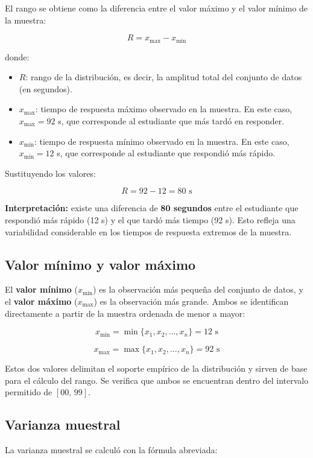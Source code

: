 \documentclass[12pt,letterpaper]{article}
\begin{document}
El rango se obtiene como la diferencia entre el valor máximo y el valor mínimo de la muestra:

\[
R=x_{\max}-x_{\min}
\]

donde:
\begin{itemize}[leftmargin=1.2cm]
    \item $R$: rango de la distribución, es decir, la amplitud total del conjunto de datos (en segundos).
    \item $x_{\max}$: tiempo de respuesta máximo observado en la muestra. En este caso, $x_{\max} = 92$ s, que corresponde al estudiante que más tardó en responder.
    \item $x_{\min}$: tiempo de respuesta mínimo observado en la muestra. En este caso, $x_{\min} = 12$ s, que corresponde al estudiante que respondió más rápido.
\end{itemize}

Sustituyendo los valores:

\[
R=92-12=80 \text{ s}
\]

\textbf{Interpretación:} existe una diferencia de \textbf{80 segundos} entre el estudiante que respondió más rápido (12 s) y el que tardó más tiempo (92 s). Esto refleja una variabilidad considerable en los tiempos de respuesta extremos de la muestra.

\subsection{Valor mínimo y valor máximo}

El \textbf{valor mínimo} ($x_{\min}$) es la observación más pequeña del conjunto de datos, y el \textbf{valor máximo} ($x_{\max}$) es la observación más grande. Ambos se identifican directamente a partir de la muestra ordenada de menor a mayor:

\[
x_{\min} = \min\{x_1, x_2, \ldots, x_n\} = 12 \text{ s}
\]

\[
x_{\max} = \max\{x_1, x_2, \ldots, x_n\} = 92 \text{ s}
\]

Estos dos valores delimitan el soporte empírico de la distribución y sirven de base para el cálculo del rango. Se verifica que ambos se encuentran dentro del intervalo permitido de $[00,\, 99]$.

\subsection{Varianza muestral}

La varianza muestral se calculó con la fórmula abreviada:
\end{document}
